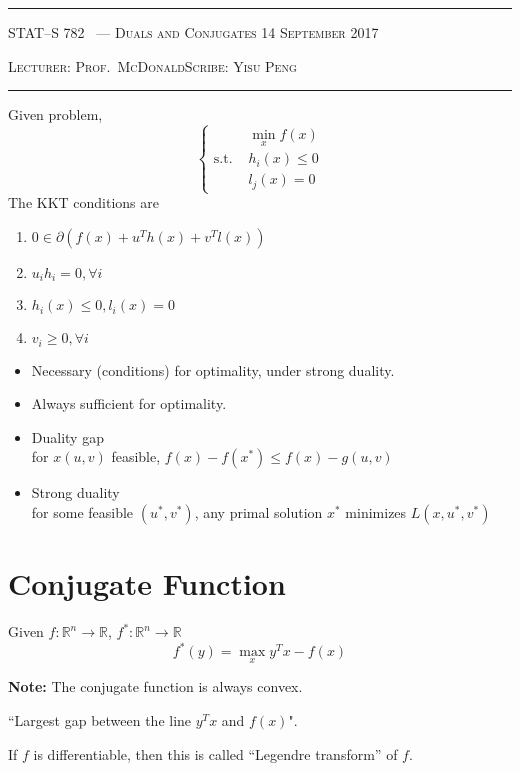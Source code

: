 \documentclass[10pt]{article}
\newcounter{lecnum}
\newcommand{\lecturer}{Prof.\ McDonald}
\newcommand{\scribe}{Yisu Peng}
\newcommand{\chtitle}{Duals and Conjugates}
\newcommand{\lecdate}{14 September 2017}
\begin{document}
\rule{6.5in}{1pt}

\textsc{STAT--S 782
        \hfill \thelecnum\ --- \chtitle
        \hfill \lecdate}

\textsc{Lecturer: \lecturer \hfill Scribe: \scribe}
\rule{6.5in}{1pt}

Given problem,
\begin{equation}
\left\{
\begin{array}{lll}
&\min\limits_x f(x)\\
\text{s.t. } &h_i(x) \le 0\\
&l_j(x) = 0
\end{array}
\right.
\end{equation}
The KKT conditions are
\begin{enumerate}
\item $0 \in \partial(f(x) + u^Th(x) + v^T l(x))$
\item $u_i h_i = 0, \forall i$
\item $h_i(x) \le 0, l_i(x) = 0$
\item $v_i \ge 0, \forall i$
\end{enumerate}

\begin{itemize}
\item Necessary (conditions) for optimality, under strong duality.
\item Always sufficient for optimality.
\item Duality gap\\
for $x (u,v)$ feasible, $f(x) - f(x^*) \le f(x) - g(u,v)$
\item Strong duality\\
for some feasible $(u^*, v^*)$, any primal solution $x^*$ minimizes $L(x,u^*,v^*)$
\end{itemize}


\section{Conjugate Function}

Given $f: \mathbb{R}^n \rightarrow \mathbb{R}$, $f^*: \mathbb{R}^n \rightarrow \mathbb{R}$
\begin{equation}
f^*(y) = \max\limits_x y^T x - f(x)
\end{equation}


\textbf{Note:} The conjugate function is always convex.

``Largest gap between the line $y^T x$ and $f(x)$".

If $f$ is differentiable, then this is called ``Legendre transform'' of $f$.
\end{document}
